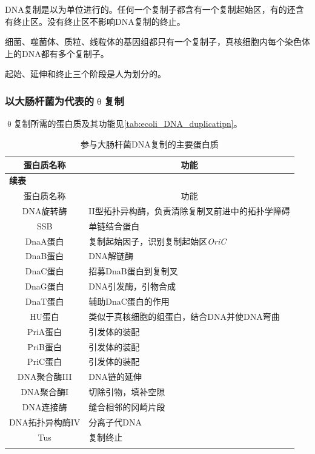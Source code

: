 DNA复制是以为单位进行的。任何一个复制子都含有一个复制起始区，有的还含有终止区。没有终止区不影响DNA复制的终止。

细菌、噬菌体、质粒、线粒体的基因组都只有一个复制子，真核细胞内每个染色体上的DNA都有多个复制子。

起始、延伸和终止三个阶段是人为划分的。

\subsubsection{以大肠杆菌为代表的$\uptheta$复制}

$\uptheta$复制所需的蛋白质及其功能见\autoref{tab:ecoli_DNA_duplicatipn}。

\begin{longtable}[c]{|c|l|}
	\hline
	\multicolumn{1}{|c|}{蛋白质名称} & \multicolumn{1}{c|}{功能} \\ \hline
	\endfirsthead
	\multicolumn{2}{l}{\textbf{续表}} \\
	\hline
	\multicolumn{1}{|c|}{蛋白质名称} & \multicolumn{1}{c|}{功能} \\ \hline
	\endhead
	DNA旋转酶 & II型拓扑异构酶，负责清除复制叉前进中的拓扑学障碍 \\ \hline
	SSB & 单链结合蛋白 \\ \hline
	DnaA蛋白 & 复制起始因子，识别复制起始区\textit{OriC} \\ \hline
	DnaB蛋白 & DNA解链酶 \\ \hline
	DnaC蛋白 & 招募DnaB蛋白到复制叉 \\ \hline
	DnaG蛋白 & DNA引发酶，引物合成 \\ \hline
	DnaT蛋白 & 辅助DnaC蛋白的作用 \\ \hline
	HU蛋白 & 类似于真核细胞的组蛋白，结合DNA并使DNA弯曲 \\ \hline
	PriA蛋白 & 引发体的装配 \\ \hline
	PriB蛋白 & 引发体的装配 \\ \hline
	PriC蛋白 & 引发体的装配 \\ \hline
	DNA聚合酶III & DNA链的延伸 \\ \hline
	DNA聚合酶I & 切除引物，填补空隙 \\ \hline
	DNA连接酶 & 缝合相邻的冈崎片段 \\ \hline
	DNA拓扑异构酶IV & 分离子代DNA \\ \hline
	Tus & 复制终止
	\\ \hline
	\caption{参与大肠杆菌DNA复制的主要蛋白质}
	\label{tab:ecoli_DNA_duplicatipn}
\end{longtable}
